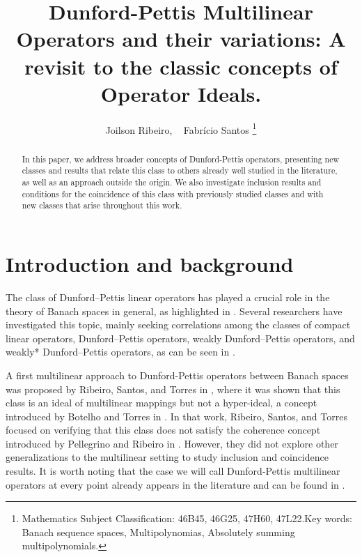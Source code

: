 \documentclass[12 pt]{article}%
\newtheorem{final remark}[theorem]{Final Remark}
\begin{document}
	
	\title{\sc Dunford-Pettis Multilinear Operators and their variations: A revisit to the classic concepts of Operator Ideals.}
	\author{Joilson Ribeiro,%
		~ Fabr\'icio Santos \thanks{
			\newline{} Mathematics Subject
			Classification: 46B45, 46G25, 47H60, 47L22.\newline\indent Key words: Banach sequence spaces, Multipolynomias, Absolutely summing multipolynomials.}}
	\date{}
	\maketitle
	
	
	\begin{abstract}
		In this paper, we address broader concepts of Dunford-Pettis operators, presenting new classes and results that relate this class to others already well studied in the literature, as well as an approach outside the origin. We also investigate inclusion results and conditions for the coincidence of this class with previously studied classes and with new classes that arise throughout this work.
	\end{abstract}
	
	\section{Introduction and background}
	
	
	The class of Dunford–Pettis linear operators has played a crucial role in the theory of Banach spaces in general, as highlighted in \cite{DU77}. Several researchers have investigated this topic, mainly seeking correlations among the classes of compact linear operators, Dunford–Pettis operators, weakly Dunford–Pettis operators, and weakly* Dunford–Pettis operators, as can be seen in \cite{AB82, BHJ22, BKAB24}.
	
	A first multilinear approach to Dunford-Pettis operators between Banach spaces was proposed by Ribeiro, Santos, and Torres in \cite{RST22}, where it was shown that this class is an ideal of multilinear mappings but not a hyper-ideal, a concept introduced by Botelho and Torres in \cite{BT15}. In that work, Ribeiro, Santos, and Torres focused on verifying that this class does not satisfy the coherence concept introduced by Pellegrino and Ribeiro in \cite{PR14}. However, they did not explore other generalizations to the multilinear setting to study inclusion and coincidence results. It is worth noting that the case we will call Dunford-Pettis multilinear operators at every point already appears in the literature and can be found in \cite{AD02, BR98}.
	 
\end{document}
